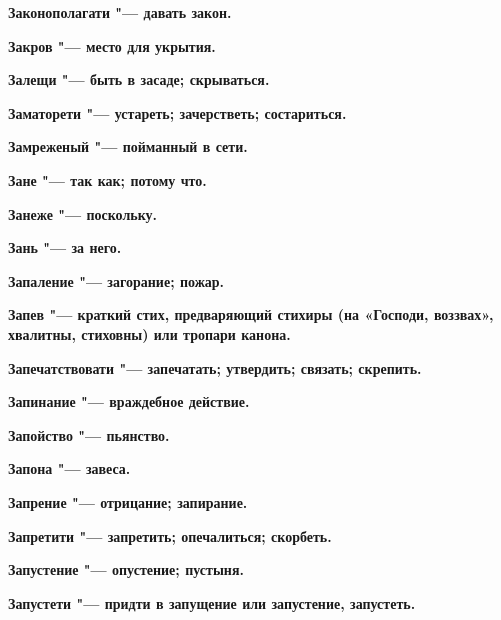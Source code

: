 \begin{mymulticols}{2}
\bfseries Законополагати\normalfont{} "--- давать закон. 




\bfseries Закров\normalfont{} "--- место для укрытия. 




\bfseries Залещи\normalfont{} "--- быть в засаде; скрываться. 




\bfseries Заматорети\normalfont{} "--- устареть; зачерстветь; состариться. 




\bfseries Замреженый\normalfont{} "--- пойманный в сети. 




\bfseries Зане\normalfont{} "--- так как; потому что. 




\bfseries Занеже\normalfont{} "--- поскольку. 




\bfseries Зань\normalfont{} "--- за него. 




\bfseries Запаление\normalfont{} "--- загорание; пожар. 




\bfseries Запев\normalfont{} "--- краткий стих, предваряющий стихиры (на «Господи, воззвах», хвалитны, стиховны) или тропари канона. 




\bfseries Запечатствовати\normalfont{} "--- запечатать; утвердить; связать; скрепить. 




\bfseries Запинание\normalfont{} "--- враждебное действие. 




\bfseries Запойство\normalfont{} "--- пьянство. 




\bfseries Запона\normalfont{} "--- завеса. 




\bfseries Запрение\normalfont{} "--- отрицание; запирание. 




\bfseries Запретити\normalfont{} "--- запретить; опечалиться; скорбеть. 




\bfseries Запустение\normalfont{} "--- опустение; пустыня. 




\bfseries Запустети\normalfont{} "--- придти в запущение или запустение, запустеть. 





\end{mymulticols}
